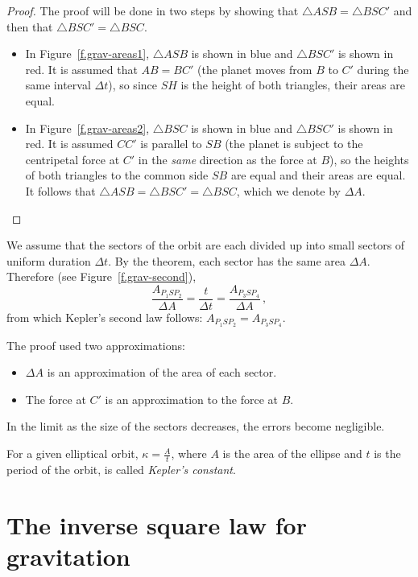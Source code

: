 \begin{proof}
The proof will be done in two steps by showing that $\triangle ASB=\triangle BSC'$ and then that $\triangle BSC'=\triangle BSC$.
\begin{itemize}
\item In Figure~\ref{f.grav-areas1}, $\triangle ASB$ is shown in blue and $\triangle BSC'$ is shown in red. It is assumed that $AB=BC'$ (the planet moves from $B$ to $C'$ during the same interval $\Delta t$), so since $SH$ is the height of both triangles, their areas are equal.
\item In Figure~\ref{f.grav-areas2}, $\triangle BSC$ is shown in blue and $\triangle BSC'$ is shown in red. It is assumed $CC'$ is parallel to $SB$ (the planet is subject to the centripetal force at $C'$ in the \emph{same} direction as the force at $B$), so the heights of both triangles to the common side $SB$ are equal and their areas are equal. It follows that $\triangle ASB=\triangle BSC'=\triangle BSC$, which we denote by $\Delta A$.\hqed
\end{itemize}
\end{proof}

We assume that the sectors of the orbit are each divided up into small sectors of uniform duration $\Delta t$. By the theorem, each sector has the same area $\Delta A$. Therefore (see Figure~\ref{f.grav-second}),
\[
\frac{A_{P_1SP_2}}{\Delta A} =\frac{t}{\Delta t} = \frac{A_{P_3SP_4}}{\Delta A}\,,
\]
from which Kepler's second law follows: $A_{P_1SP_2}=A_{P_3SP_4}$.

The proof used two approximations:
\begin{itemize}
\item $\Delta A$ is an approximation of the area of each sector.
\item The force at $C'$ is an approximation to the force at $B$.
\end{itemize}
In the limit as the size of the sectors decreases, the errors become negligible.

\begin{definition}\label{def.kappa}
For a given elliptical orbit, $\kappa=\displaystyle\frac{A}{t}$, where $A$ is the area of the ellipse and $t$ is the period of the orbit, is called \emph{Kepler's constant}.
\end{definition}


\section{The inverse square law for gravitation}

